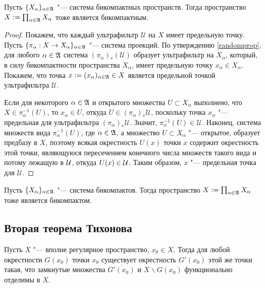 \begin{theorem}
    Пусть $\lbrace X_{\alpha}\rbrace_{\alpha \in \mathfrak A}$ "--- система бикомпактных пространств. Тогда пространство $X := \prod_{\alpha \in \mathfrak A}X_{\alpha}$ тоже является бикомпактным.
\end{theorem}

\begin{proof}
    Покажем, что каждый ультрафильтр $\mathcal{U}$ на $X$ имеет предельную точку. Пусть $\{\pi_{\alpha}: X \rightarrow X_{\alpha}\}_{\alpha \in \mathfrak A}$ "--- система проекций. По утверждению \ref{randomprop}, для любого $\alpha \in \mathfrak A$ система $(\pi_{\alpha})_*(\mathcal{U})$ образует ультрафильтр на $X_{\alpha}$, который, в силу бикомпактности пространства $X_{\alpha}$, имеет предельную точку $x_{\alpha} \in X_\alpha$. Покажем, что точка $x := (x_{\alpha})_{\alpha \in \mathfrak A} \in X$ является предельной точкой ультрафильтра $\mathcal{U}$.
    
    Если для некоторого $\alpha \in \mathfrak A$ и открытого множества $U \subset X_\alpha$ выполнено, что $X \in \pi_{\alpha}^{-1}(U)$, то $x_{\alpha} \in U$, откуда $U \in (\pi_{\alpha})_*\mathcal{U}$, поскольку точка $x_\alpha$ "--- предельная для ультрафильтра $(\pi_{\alpha})_*\mathcal{U}$. Значит, $\pi_{\alpha}^{-1}(U) \in \mathcal{U}$. Наконец, система множеств вида $\pi_{\alpha}^{-1}(U)$, где $\alpha \in \mathfrak A$, а множество $U \subset X_\alpha$ "--- открытое, образует предбазу в $X$, поэтому всякая окрестность $U(x)$ точки $x$ содержит окрестность этой точки, являющуюся пересечением конечного числа множеств такого вида и потому лежащую в $\mathcal U$, откуда $U(x) \in \mathcal U$. Таким образом, $x$ "--- предельная точка для $\mathcal{U}$.
\end{proof}

\begin{corollary}
    Пусть $\lbrace X_{\alpha}\rbrace_{\alpha \in \mathfrak A}$ "--- система бикомпактов. Тогда пространство $X := \prod_{\alpha \in \mathfrak A}X_{\alpha}$ тоже является бикомпактом.
\end{corollary}

\subsection{Вторая теорема Тихонова}

\begin{proposition}
    Пусть $X$ "--- вполне регулярное пространство, $x_0 \in X$. Тогда для любой окрестности $G(x_0)$ точки $x_0$ существует окрестность $G'(x_0)$ этой же точки такая, что замкнутые множества $\overline{G'(x_0)}$ и $X \backslash G(x_0)$ функционально отделимы в $X$.
\end{proposition}

